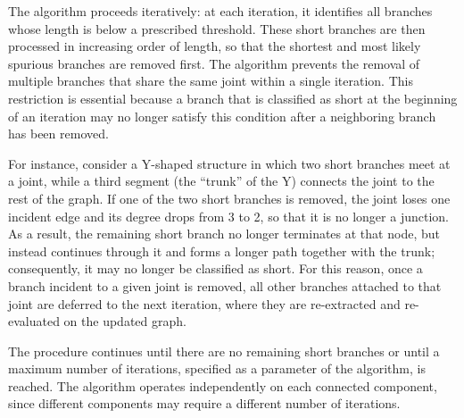 \documentclass[english,12pt,a4paper]{article}
\begin{document}
	The algorithm proceeds iteratively: at each iteration, it identifies all branches whose length is below a prescribed threshold. These short branches are then processed in increasing order of length, so that the shortest and most likely spurious branches are removed first. The algorithm prevents the removal of multiple branches that share the same joint within a single iteration. This restriction is essential because a branch that is classified as short at the beginning of an iteration may no longer satisfy this condition after a neighboring branch has been removed.
	
	For instance, consider a Y-shaped structure in which two short branches meet at a joint, while a third segment (the ``trunk'' of the Y) connects the joint to the rest of the graph. If one of the two short branches is removed, the joint loses one incident edge and its degree drops from 3 to 2, so that it is no longer a junction. As a result, the remaining short branch no longer terminates at that node, but instead continues through it and forms a longer path together with the trunk; consequently, it may no longer be classified as short. For this reason, once a branch incident to a given joint is removed, all other branches attached to that joint are deferred to the next iteration, where they are re-extracted and re-evaluated on the updated graph.
	
	The procedure continues until there are no remaining short branches or until a maximum number of iterations, specified as a parameter of the algorithm, is reached. The algorithm operates independently on each connected component, since different components may require a different number of iterations.
	
\end{document}
